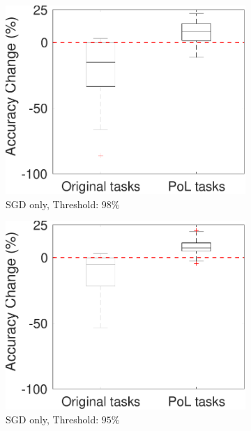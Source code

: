 \begin{figure}[!t]
     \begin{subfigure}{.3\textwidth}
        \includegraphics[width=1\textwidth]{../other/figures/98-122-4_v1.pdf}
        \caption{SGD only, Threshold: $98\%$}
        \label{98_box_SGD}
    \end{subfigure}
    \begin{subfigure}{.3\textwidth}
        \includegraphics[width=1\textwidth]{../other/figures/95-123-4_v1.pdf}
        \caption{SGD only, Threshold: $95\%$}
        \label{95_box_SGD}
    \end{subfigure}
    \begin{subfigure}{.3\textwidth}

\end{subfigure}
\end{figure}
